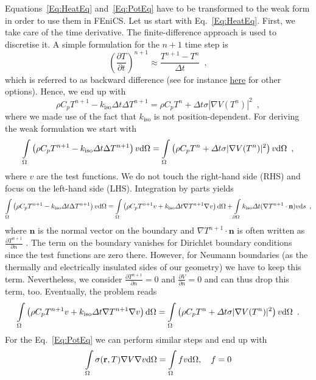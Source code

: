 \documentclass{article}
\begin{document}
Equations~\eqref{Eq:HeatEq} and~\eqref{Eq:PotEq} have to be transformed to the weak form in order to use them in FEniCS.
Let us start with Eq.~\ref{Eq:HeatEq}. 
First, we take care of the time derivative. 
The finite-difference approach is used to discretise it.
A simple formulation for the $n+1$ time step is
\begin{equation}
\left(\frac{\partial T}{\partial t} \right)^{n+1} \approx \frac{T^{n+1} - T^n}{\varDelta t} \enspace ,
\end{equation}
which is referred to as backward difference (see for instance \href{http://mathworld.wolfram.com/FiniteDifference.html}{here} for other options).
Hence, we end up with 
\begin{equation}
\rho C_p T^{n+1} - k_\mathrm{iso} \varDelta t \Delta T^{n+1} = \rho C_p T^n + \varDelta t \sigma |\nabla V(T^n)|^2  \enspace ,
\end{equation}
where we made use of the fact that $k_\mathrm{iso}$ is not position-dependent.
For deriving the weak formulation we start with
\begin{equation}
\intop_\Omega \left( \rho C_p T^{n+1} - k_\mathrm{iso} \varDelta t \Delta T^{n+1} \right) v \mathrm{d}\Omega	 = \intop_\Omega \left(\rho C_p T^n + \varDelta t \sigma |\nabla V(T^n)|^2\right) v \mathrm{d}\Omega	\enspace ,
\end{equation}
where $v$ are the test functions.
We do not touch the right-hand side (RHS) and focus on the left-hand side (LHS).
Integration by parts yields
\begin{equation}
\intop_\Omega \left( \rho C_p T^{n+1} - k_\mathrm{iso} \varDelta t \Delta T^{n+1} \right) v \mathrm{d}\Omega = \intop_\Omega \left( \rho C_p T^{n+1} v + k_\mathrm{iso} \varDelta t \nabla T^{n+1} \nabla v\right)  \mathrm{d}\Omega + \intop_{\partial \Omega}  k_\mathrm{iso} \varDelta t (\nabla T^{n+1} \cdot \mathbf{n}) v \mathrm{d}s \enspace ,
\end{equation}
where $\mathbf{n}$ is the normal vector on the boundary and $\nabla T^{n+1} \cdot \mathbf{n}$ is often written as $\frac{\partial T^{n+1}}{\partial n}$ .
The term on the boundary vanishes for Dirichlet boundary conditions since the test functions are zero there. 
However, for Neumann boundaries (as the thermally and electrically insulated sides of our geometry) we have to keep this term. 
Nevertheless, we consider $\frac{\partial T^{n+1}}{\partial n}= 0$ and $\frac{\partial V}{\partial n}=0$ and can thus drop this term, too.
Eventually, the problem reads
\begin{equation}
\label{Eq:WeakT}
 \intop_\Omega \left( \rho C_p T^{n+1} v + k_\mathrm{iso} \varDelta t \nabla T^{n+1} \nabla v\right)  \mathrm{d}\Omega  = \intop_\Omega \left(\rho C_p T^n + \varDelta t \sigma |\nabla V(T^n)|^2\right) v \mathrm{d}\Omega	\enspace .
\end{equation}
For the Eq.~\eqref{Eq:PotEq} we can perform similar steps and end up with
\begin{equation}
\label{Eq:WeakPot}
\intop_\Omega \sigma(\mathbf{r}, T) \nabla V \nabla v \mathrm{d}\Omega = \intop_\Omega f v \mathrm{d} \Omega,~~~ f=0
\end{equation}
\end{document}
